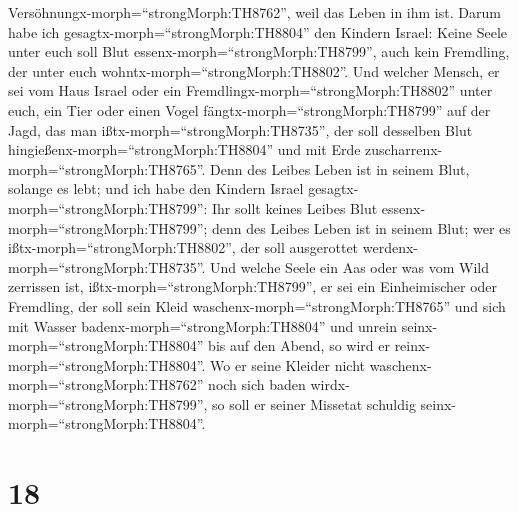 Versöhnungx-morph=``strongMorph:TH8762'', weil das Leben in ihm ist.
 Darum habe ich gesagtx-morph=``strongMorph:TH8804'' den
Kindern Israel: Keine Seele unter euch soll Blut
essenx-morph=``strongMorph:TH8799'', auch kein Fremdling, der unter euch
wohntx-morph=``strongMorph:TH8802''.  Und welcher Mensch,
er sei vom Haus Israel oder ein Fremdlingx-morph=``strongMorph:TH8802''
unter euch, ein Tier oder einen Vogel
fängtx-morph=``strongMorph:TH8799'' auf der Jagd, das man
ißtx-morph=``strongMorph:TH8735'', der soll desselben Blut
hingießenx-morph=``strongMorph:TH8804'' und mit Erde
zuscharrenx-morph=``strongMorph:TH8765''.  Denn des Leibes
Leben ist in seinem Blut, solange es lebt; und ich habe den Kindern
Israel gesagtx-morph=``strongMorph:TH8799'': Ihr sollt keines Leibes
Blut essenx-morph=``strongMorph:TH8799''; denn des Leibes Leben ist in
seinem Blut; wer es ißtx-morph=``strongMorph:TH8802'', der soll
ausgerottet werdenx-morph=``strongMorph:TH8735''.  Und
welche Seele ein Aas oder was vom Wild zerrissen ist,
ißtx-morph=``strongMorph:TH8799'', er sei ein Einheimischer oder
Fremdling, der soll sein Kleid waschenx-morph=``strongMorph:TH8765'' und
sich mit Wasser badenx-morph=``strongMorph:TH8804'' und unrein
seinx-morph=``strongMorph:TH8804'' bis auf den Abend, so wird er
reinx-morph=``strongMorph:TH8804''.  Wo er seine Kleider
nicht waschenx-morph=``strongMorph:TH8762'' noch sich baden
wirdx-morph=``strongMorph:TH8799'', so soll er seiner Missetat schuldig
seinx-morph=``strongMorph:TH8804''.

\hypertarget{section-17}{%
\section{18}\label{section-17}}

